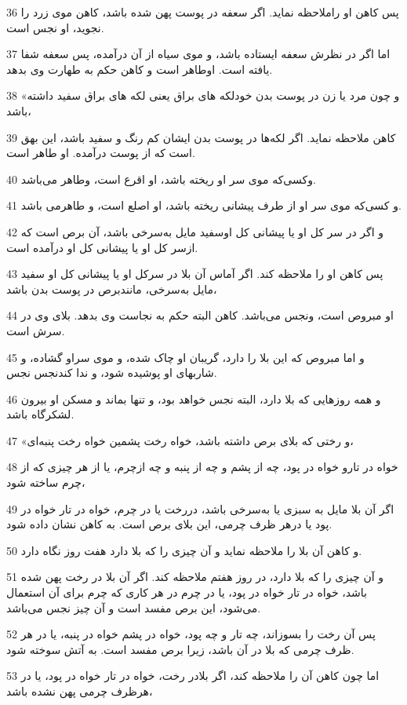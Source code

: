 \par 36 پس کاهن او راملاحظه نماید. اگر سعفه در پوست پهن شده باشد، کاهن موی زرد را نجوید، او نجس است.
\par 37 اما اگر در نظرش سعفه ایستاده باشد، و موی سیاه از آن در‌آمده، پس سعفه شفا یافته است. اوطاهر است و کاهن حکم به طهارت وی بدهد. 
\par 38 «و چون مرد یا زن در پوست بدن خودلکه های براق یعنی لکه های براق سفید داشته باشد،
\par 39 کاهن ملاحظه نماید. اگر لکه‌ها در پوست بدن ایشان کم رنگ و سفید باشد، این بهق است که از پوست درآمده. او طاهر است.
\par 40 وکسی‌که موی سر او ریخته باشد، او اقرع است، وطاهر می‌باشد.
\par 41 و کسی‌که موی سر او از طرف پیشانی ریخته باشد، او اصلع است، و طاهرمی باشد.
\par 42 و اگر در سر کل او یا پیشانی کل اوسفید مایل به‌سرخی باشد، آن برص است که ازسر کل او یا پیشانی کل او در‌آمده است.
\par 43 پس کاهن او را ملاحظه کند. اگر آماس آن بلا در سرکل او یا پیشانی کل او سفید مایل به‌سرخی، مانندبرص در پوست بدن باشد،
\par 44 او مبروص است، ونجس می‌باشد. کاهن البته حکم به نجاست وی بدهد. بلای وی در سرش است.
\par 45 و اما مبروص که این بلا را دارد، گریبان او چاک شده، و موی سراو گشاده، و شاربهای او پوشیده شود، و ندا کندنجس نجس.
\par 46 و همه روزهایی که بلا دارد، البته نجس خواهد بود، و تنها بماند و مسکن او بیرون لشکرگاه باشد.
\par 47 «و رختی که بلای برص داشته باشد، خواه رخت پشمین خواه رخت پنبه‌ای،
\par 48 خواه در تارو خواه در پود، چه از پشم و چه از پنبه و چه ازچرم، یا از هر چیزی که از چرم ساخته شود،
\par 49 اگر آن بلا مایل به سبزی یا به‌سرخی باشد، دررخت یا در چرم، خواه در تار خواه در پود یا درهر ظرف چرمی، این بلای برص است. به کاهن نشان داده شود.
\par 50 و کاهن آن بلا را ملاحظه نماید و آن چیزی را که بلا دارد هفت روز نگاه دارد.
\par 51 و آن چیزی را که بلا دارد، در روز هفتم ملاحظه کند. اگر آن بلا در رخت پهن شده باشد، خواه در تار خواه در پود، یا در چرم در هر کاری که چرم برای آن استعمال می‌شود، این برص مفسد است و آن چیز نجس می‌باشد.
\par 52 پس آن رخت را بسوزاند، چه تار و چه پود، خواه در پشم خواه در پنبه، یا در هر ظرف چرمی که بلا در آن باشد، زیرا برص مفسد است. به آتش سوخته شود.
\par 53 اما چون کاهن آن را ملاحظه کند، اگر بلادر رخت، خواه در تار خواه در پود، یا در هرظرف چرمی پهن نشده باشد،
